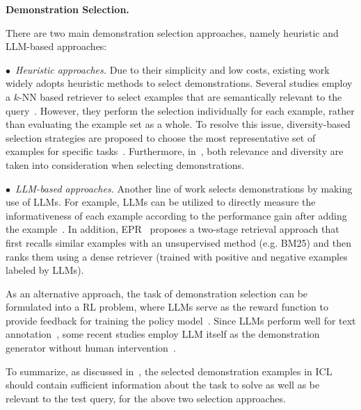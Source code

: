 {{{{{{\textbf{Demonstration Selection.}

There are two main demonstration selection approaches, namely heuristic and LLM-based approaches:

$\bullet$~\emph{Heuristic approaches.} {Due to their simplicity and low costs,} existing work widely adopts heuristic methods to select demonstrations. Several studies employ a $k$-NN based retriever to select examples that are semantically relevant to the query~\cite{Liu-ACL-2022-What, Lee-COLING-2022-Does}. {However, they perform the selection individually for each example, rather than evaluating the example set as a whole.} To resolve this issue, diversity-based selection strategies are proposed to choose the most representative set of examples for specific tasks~\cite{Levy-arxiv-2022-Diverse, Su-arxiv-2022-selective}. Furthermore, in~\cite{Ye-arxiv-2022-Complementary}, both relevance and diversity are taken into consideration when selecting demonstrations.

$\bullet$~\emph{LLM-based approaches.} Another line of work selects demonstrations by making use of LLMs. For example, LLMs can be utilized to directly measure the informativeness of each example according to the performance gain after adding the example~\cite{Li-arxiv-2023-Finding}. In addition, EPR~\cite{Rubin-NAACL-2022-Learning} proposes a two-stage retrieval approach that first recalls similar examples with an unsupervised method (e.g. BM25) and then ranks them using a dense retriever (trained with positive and negative examples labeled by LLMs).

As an alternative approach, the task of demonstration selection can be formulated into a RL problem, where LLMs serve as the reward function to provide feedback for training the policy model~\cite{Zhang-EMNLP-2022-Active}. Since LLMs perform well for text annotation~\cite{Gilardi-arXiv-2023-Crowd}, some recent studies employ LLM itself as the demonstration generator without human intervention~\cite{Kim-arxiv-2022-Self-Generated}. 

{To summarize, as discussed in~\cite{Michael-ICLR-2022-An}, the selected demonstration examples in ICL should contain sufficient information about the task to solve as well as be relevant to the test query, for the above two selection approaches.} 

}}}}}}
